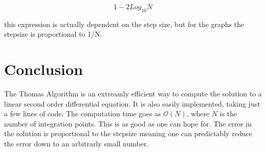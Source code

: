 \documentclass[twocolumn, groupedaddress]{revtex4-1}
\begin{document}
\begin{equation}
1-2 Log_{10} N
\end{equation}

this expression is actually dependent on the step size, but for the graphs the stepsize is proportional to 1/N.

\section{Conclusion}
The Thomas Algorithm is an extreamly efficient way to compute the solution to a linear second order differential equation.  It is also easily implemented, taking just a few lines of code.  The computation time goes as $\mathcal{O}(N)$, where $N$ is the number of integration points.  This is as good as one can hope for.  The error in the solution is proportional to the stepsize meaning one can predictably reduce the error down to an arbitrarly small number.


\end{document}
